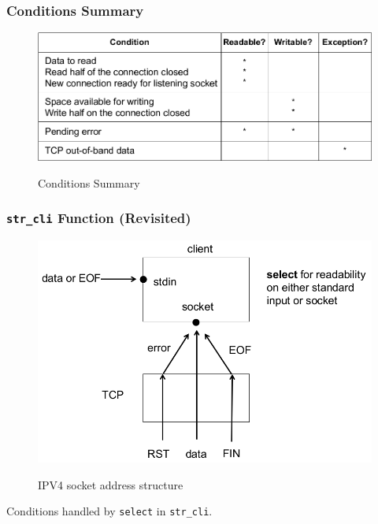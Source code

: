 \documentclass[notes,serif]{beamer}
\begin{document}
\begin{frame}
\frametitle{Conditions Summary}
  \begin{figure}
  \centering
  \includegraphics[width=.8\textwidth]{fig/03fig07.png}\\
  \caption{Conditions Summary}
  \label{9}
  \end{figure}
\end{frame}

\begin{frame}
\frametitle{\texttt{str\_cli} Function (Revisited)}
  \begin{figure}
  \centering
  \includegraphics[width=.8\textwidth]{fig/03fig08.png}\\
  \caption{IPV4 socket address structure}
  \label{10}
  \end{figure}
  Conditions handled by \texttt{select} in \texttt{str\_cli}.
\end{frame}
\end{document}
